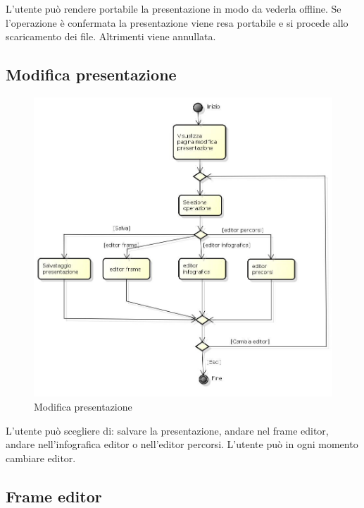 L'utente può rendere portabile la presentazione in modo da vederla offline. Se l'operazione è confermata la presentazione viene resa portabile e si procede allo scaricamento dei file. Altrimenti viene annullata.

\newpage

\subsection{Modifica presentazione}

\begin{figure}[h!]
		\centering
		\includegraphics[scale=.5]{img/Modifica_presentazione.jpg}
		\caption{Modifica presentazione}
		\label{fig:Modifica_presentazione}
\end{figure}

L'utente può scegliere di: salvare la presentazione, andare nel frame editor, andare nell'infografica editor o nell'editor percorsi.
L'utente può in ogni momento cambiare editor.

\newpage

\subsection{Frame editor}

